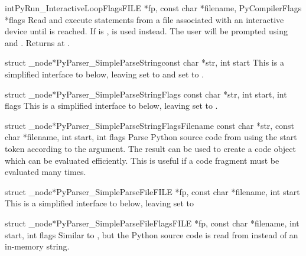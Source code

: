 \begin{cfuncdesc}{int}{PyRun_InteractiveLoopFlags}{FILE *fp, 
                                                   const char *filename,
                                                   PyCompilerFlags *flags}
  Read and execute statements from a file associated with an
  interactive device until \EOF{} is reached.  If  is
  \NULL,  is used instead.  The user will be prompted
  using  and .  Returns  at \EOF.
\end{cfuncdesc}

\begin{cfuncdesc}{struct _node*}{PyParser_SimpleParseString}{const char *str,
                                                             int start}
  This is a simplified interface to
   below, leaving 
   set to \NULL{} and  set to .
\end{cfuncdesc}

\begin{cfuncdesc}{struct _node*}{PyParser_SimpleParseStringFlags}{
                                 const char *str, int start, int flags}
  This is a simplified interface to
   below, leaving 
   set to \NULL.
\end{cfuncdesc}

\begin{cfuncdesc}{struct _node*}{PyParser_SimpleParseStringFlagsFilename}{
                                 const char *str, const char *filename,
                                 int start, int flags}
  Parse Python source code from  using the start token
   according to the  argument.  The result can
  be used to create a code object which can be evaluated efficiently.
  This is useful if a code fragment must be evaluated many times.
\end{cfuncdesc}

\begin{cfuncdesc}{struct _node*}{PyParser_SimpleParseFile}{FILE *fp,
                                 const char *filename, int start}
  This is a simplified interface to 
  below, leaving  set to 
\end{cfuncdesc}

\begin{cfuncdesc}{struct _node*}{PyParser_SimpleParseFileFlags}{FILE *fp,
                                 const char *filename, int start, int flags}
  Similar to , but
  the Python source code is read from  instead of an in-memory
  string.
\end{cfuncdesc}


